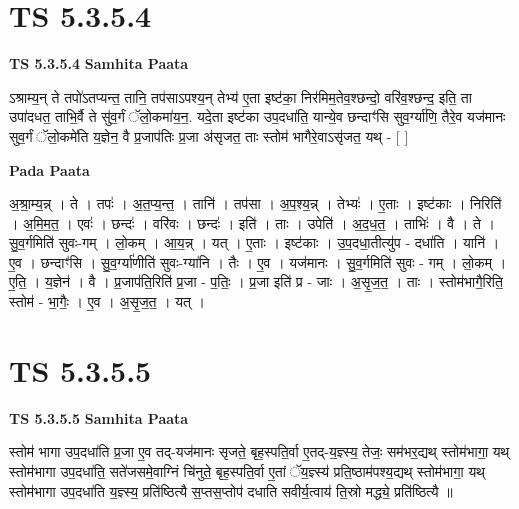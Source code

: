 \documentclass[17pt]{extarticle}
\begin{document}

\section{ TS 5.3.5.4 }

\textbf{TS 5.3.5.4 } \newline
\textbf{Samhita Paata} \newline

ऽश्राम्य॒न् ते तपो॑ऽतप्यन्त॒ तानि॒ तप॑साऽपश्य॒न् तेभ्य॑ ए॒ता इष्ट॑का॒ निर॑मिम॒तेव॒श्छन्दो॒ वरि॑व॒श्छन्द॒ इति॒ ता उपा॑दधत॒ ताभि॒र्वै ते सु॑व॒र्गं ॅलो॒कमा॑य॒न॒. यदे॒ता इष्ट॑का उप॒दधा॑ति॒ यान्ये॒व छन्दाꣳ॑सि सुव॒र्ग्या॑णि॒ तैरे॒व यज॑मानः सुव॒र्गं ॅलो॒कमे॑ति य॒ज्ञेन॒ वै प्र॒जाप॑तिः प्र॒जा अ॑सृजत॒ ताः स्तोम॑ भागैरे॒वाऽसृ॑जत॒ यथ् - [  ] \newline

\textbf{Pada Paata} \newline

अ॒श्रा॒म्य॒न्न् । ते । तपः॑ । अ॒त॒प्य॒न्त॒ । तानि॑ । तप॑सा । अ॒प॒श्य॒न्न् । तेभ्यः॑ । ए॒ताः । इष्ट॑काः । निरिति॑ । अ॒मि॒म॒त॒ । एवः॑ । छन्दः॑ । वरि॑वः । छन्दः॑ । इति॑ । ताः । उपेति॑ । अ॒द॒ध॒त॒ । ताभिः॑ । वै । ते । सु॒व॒र्गमिति॑ सुवः-गम् । लो॒कम् । आ॒य॒न्न् । यत् । ए॒ताः । इष्ट॑काः । उ॒प॒दधा॒तीत्यु॑प - दधा॑ति । यानि॑ । ए॒व । छन्दाꣳ॑सि । सु॒व॒र्ग्या॑णीति॑ सुवः-ग्या॑नि । तैः । ए॒व । यज॑मानः । सु॒व॒र्गमिति॑ सुवः - गम् । लो॒कम् । ए॒ति॒ । य॒ज्ञेन॑ । वै । प्र॒जाप॑ति॒रिति॑ प्र॒जा - प॒तिः॒ । प्र॒जा इति॑ प्र - जाः । अ॒सृ॒ज॒त॒ । ताः । स्तोम॑भागै॒रिति॒ स्तोम॑ - भा॒गैः॒ । ए॒व । अ॒सृ॒ज॒त॒ । यत् ।  \newline





\section{ TS 5.3.5.5 }

\textbf{TS 5.3.5.5 } \newline
\textbf{Samhita Paata} \newline

स्तोम॑ भागा उप॒दधा॑ति प्र॒जा ए॒व तद्-यज॑मानः सृजते॒ बृह॒स्पति॒र्वा ए॒तद्-य॒ज्ञ्स्य॒ तेजः॒ सम॑भर॒द्यथ् स्तोम॑भागा॒ यथ् स्तोम॑भागा उप॒दधा॑ति॒ सते॑जसमे॒वाग्निं चि॑नुते॒ बृह॒स्पति॒र्वा ए॒तां ॅय॒ज्ञ्स्य॑ प्रति॒ष्ठाम॑पश्य॒द्यथ् स्तोम॑भागा॒ यथ् स्तोम॑भागा उप॒दधा॑ति य॒ज्ञ्स्य॒ प्रति॑ष्ठित्यै स॒प्तस॒प्तोप॑ दधाति सवीर्य॒त्वाय॑ ति॒स्रो मद्ध्ये॒ प्रति॑ष्ठित्यै ॥ \newline
\end{document}
